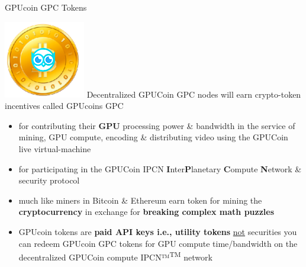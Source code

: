 
\begin{frame}[t]{GPUcoin GPC Tokens }
 
\includegraphics[scale=0.2]{static/hootcoin} Decentralized GPUCoin GPC nodes will earn crypto-token incentives called GPUcoins GPC

 \begin{itemize}[<+-| alert@+>]
 \item for contributing their \textbf{GPU} processing power \& bandwidth in the service of mining, GPU compute, encoding \& distributing video using the GPUCoin live virtual-machine 
 \item for participating in the GPUCoin IPCN \textbf{I}nter\textbf{P}lanetary \textbf{C}ompute \textbf{N}etwork \& security protocol
 \item much like miners in Bitcoin \& Ethereum earn token for mining the \textbf{cryptocurrency} in exchange for \textbf{breaking complex math puzzles}
 \item GPUcoin tokens are \textbf{paid API keys i.e., utility tokens} \underline{not} securities you can redeem GPUcoin GPC  tokens for GPU compute time/bandwidth on the decentralized GPUCoin compute IPCN™\textsuperscript{TM}  network
 \end{itemize}
 
\end{frame}